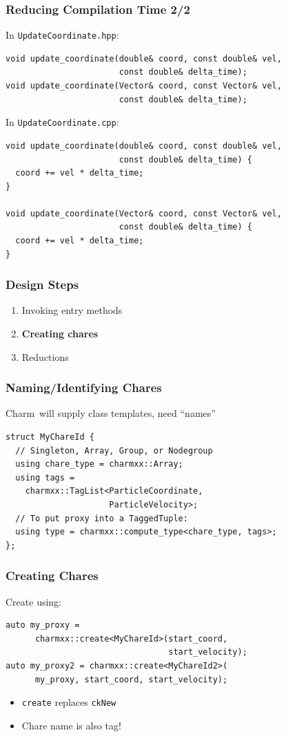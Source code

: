 \documentclass[svgnames,tikz,serif,ragged2e]{beamer}
\newcommand\Charm{Charm\nolinebreak[4]\hspace{-.05em}\raisebox{.4ex}{\relsize{-3}{\textbf{++}}}}
\begin{document}
\begin{frame}[fragile]
  \frametitle{Reducing Compilation Time 2/2}
    In \texttt{UpdateCoordinate.hpp}:
\begin{lstlisting}
void update_coordinate(double& coord, const double& vel,
                       const double& delta_time);
void update_coordinate(Vector& coord, const Vector& vel,
                       const double& delta_time);
\end{lstlisting}
  In \texttt{UpdateCoordinate.cpp}:
\begin{lstlisting}
void update_coordinate(double& coord, const double& vel,
                       const double& delta_time) {
  coord += vel * delta_time;
}

void update_coordinate(Vector& coord, const Vector& vel,
                       const double& delta_time) {
  coord += vel * delta_time;
}
\end{lstlisting}
\end{frame}

\begin{frame}[noframenumbering]
  \frametitle{Design Steps}
  \begin{enumerate}
  \item Invoking entry methods
  \item \textbf{Creating chares}
  \item Reductions
  \end{enumerate}
\end{frame}

\begin{frame}
  \frametitle{Naming/Identifying Chares}
  \Charm~will supply class templates, need ``names''
\begin{lstlisting}
struct MyChareId {
  // Singleton, Array, Group, or Nodegroup
  using chare_type = charmxx::Array;
  using tags =
    charmxx::TagList<ParticleCoordinate,
                     ParticleVelocity>;
  // To put proxy into a TaggedTuple:
  using type = charmxx::compute_type<chare_type, tags>;
};
\end{lstlisting}
\end{frame}

\begin{frame}
  \frametitle{Creating Chares}
  Create using:
\begin{lstlisting}
auto my_proxy =
      charmxx::create<MyChareId>(start_coord,
                                 start_velocity);
auto my_proxy2 = charmxx::create<MyChareId2>(
      my_proxy, start_coord, start_velocity);
\end{lstlisting}
  \begin{itemize}
  \item \texttt{create} replaces \texttt{ckNew}
  \item Chare name is also tag!
  \end{itemize}
\end{frame}
\end{document}
